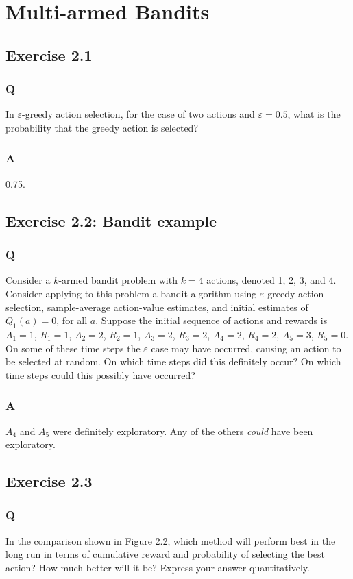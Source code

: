 \section{Multi-armed Bandits}
\subsection{Exercise 2.1}
\subsubsection*{Q}
In $\varepsilon$-greedy action selection, for the case of two actions and $\varepsilon = 0.5$, what is the probability that the greedy action is selected?

\subsubsection*{A}
0.75.


\subsection{Exercise 2.2: Bandit example}
\subsubsection*{Q}
Consider a $k$-armed bandit problem with $k = 4$ actions, denoted 1, 2, 3, and 4. Consider applying to this problem a bandit algorithm using $\varepsilon$-greedy action selection, sample-average action-value estimates, and initial estimates of $Q_1(a) = 0$, for all $a$. Suppose the initial sequence of actions and rewards is $A_1 = 1$, $R_1 =1$, $A_2 =2$, $R_2 =1$, $A_3 =2$, $R_3 =2$, $A_4 =2$, $R_4 =2$, $A_5 =3$, $R_5 =0$. On some of these time steps the $\varepsilon$ case may have occurred, causing an action to be selected at random. On which time steps did this definitely occur? On which time steps could this possibly have occurred?

\subsubsection*{A}
$A_4$ and $A_5$ were definitely exploratory. Any of the others \emph{could} have been exploratory.


\subsection{Exercise 2.3}
\subsubsection*{Q}
In the comparison shown in Figure 2.2, which method will perform best in the long run in terms of cumulative reward and probability of selecting the best action? How much better will it be? Express your answer quantitatively.

